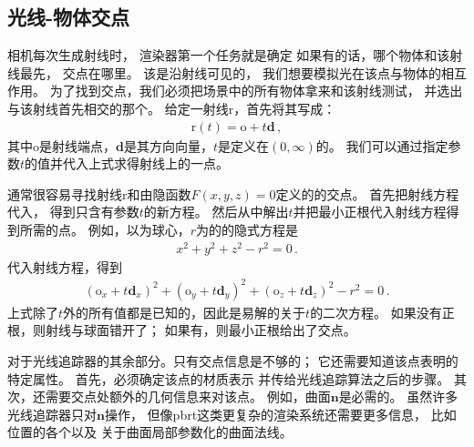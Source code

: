 \subsection{光线-物体交点}\label{sub:光线-物体交点}

相机每次生成射线时，
渲染器第一个任务就是确定
如果有的话，哪个物体和该射线最先，
交点在哪里。
该是沿射线可见的，
我们想要模拟光在该点与物体的相互作用。
为了找到交点，我们必须把场景中的所有物体拿来和该射线测试，
并选出与该射线首先相交的那个。
给定一射线$\mathrm{r}$，首先将其写成：
\begin{align*}
      \mathrm{r}(t)=\mathrm{o}+t\mathbf{d}\, ,
\end{align*}
其中$\mathrm{o}$是射线端点，$\mathbf{d}$是其方向向量，$t$是定义在$(0,\infty)$的。
我们可以通过指定参数$t$的值并代入上式求得射线上的一点。

通常很容易寻找射线$\mathrm{r}$和由隐函数$F(x,y,z)=0$定义的的交点。
首先把射线方程代入，
得到只含有参数$t$的新方程。
然后从中解出$t$并把最小正根代入射线方程得到所需的点。
例如，以为球心，$r$为的的隐式方程是
\begin{align*}
      x^2+y^2+z^2-r^2=0\, .
\end{align*}
代入射线方程，得到
\begin{align*}
      (\mathrm{o}_x+t\mathbf{d}_x)^2+(\mathrm{o}_y+t\mathbf{d}_y)^2+(\mathrm{o}_z+t\mathbf{d}_z)^2-r^2=0\, .
\end{align*}
上式除了$t$外的所有值都是已知的，因此是易解的关于$t$的二次方程。
如果没有正根，则射线与球面错开了；
如果有，则最小正根给出了交点。

对于光线追踪器的其余部分。只有交点信息是不够的；
它还需要知道该点表明的特定属性。
首先，必须确定该点的材质表示
并传给光线追踪算法之后的步骤。
其次，还需要交点处额外的几何信息来对该点。
例如，曲面$\mathbf{n}$是必需的。
虽然许多光线追踪器只对$\mathbf{n}$操作，
但像pbrt这类更复杂的渲染系统还需要更多信息，
比如位置的各个以及
关于曲面局部参数化的曲面法线。

